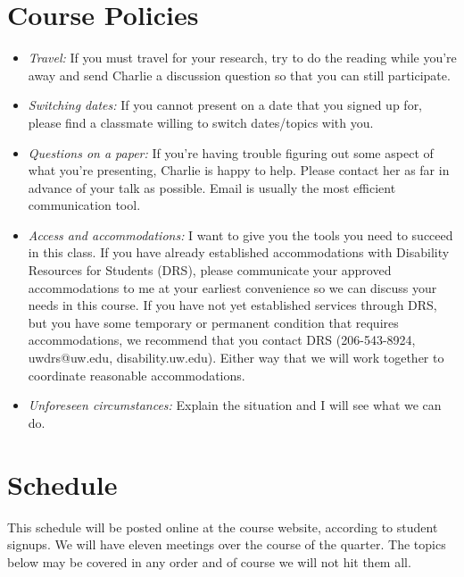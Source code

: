 \documentclass[12pt]{amsart}
\begin{document}
\section{Course Policies}
\begin{itemize}
	\item	\textit{Travel:} If you must travel for your research, try to do the reading while you're away and send Charlie a discussion question so that you can still participate.
	\item	\textit{Switching dates:} If you cannot present on a date that you signed up for, please find a classmate willing to switch dates/topics with you.
	\item	\textit{Questions on a paper:} If you're having trouble figuring out some aspect of what you're presenting, Charlie is happy to help. Please contact her as far in advance of your talk as possible. Email is usually the most efficient communication tool.
	\item	\textit{Access and accommodations:} I want to give you the tools you need to succeed in this class. If you have already established accommodations with Disability Resources for Students (DRS), please communicate your approved accommodations to me at your earliest convenience so we can discuss your needs in this course. If you have not yet established services through DRS, but you have some temporary or permanent condition that requires accommodations, we recommend that you contact DRS (206-543-8924, uwdrs@uw.edu, disability.uw.edu). Either way that we will work together to coordinate reasonable accommodations.
	\item	\textit{Unforeseen circumstances:} Explain the situation and I will see what we can do.
\end{itemize}

\section{Schedule}
This schedule will be posted online at the course website, according to student signups. We will have eleven meetings over the course of the quarter.   The topics below may be covered in any order and of course we will not hit them all.
\end{document}
